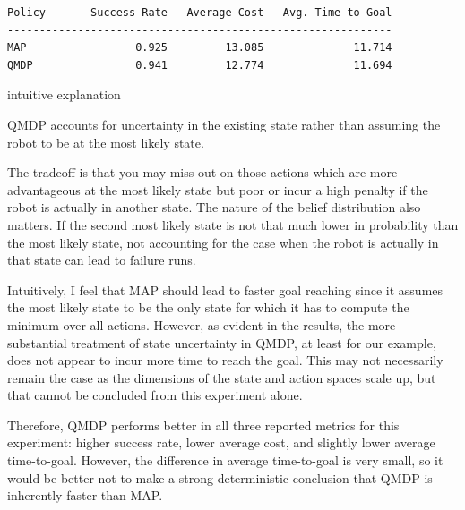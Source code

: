 \begin{Verbatim}[fontsize=\small]
Policy       Success Rate   Average Cost   Avg. Time to Goal
------------------------------------------------------------
MAP                 0.925         13.085              11.714
QMDP                0.941         12.774              11.694
\end{Verbatim}

intuitive explanation

QMDP accounts for uncertainty in the existing state rather than assuming the robot to be at the most likely state.

The tradeoff is that you may miss out on those actions which are more advantageous at the most likely state but poor or incur a high penalty if the robot is actually in another state. The nature of the belief distribution also matters. If the second most likely state is not that much lower in probability than the most likely state, not accounting for the case when the robot is actually in that state can lead to failure runs.

Intuitively, I feel that MAP should lead to faster goal reaching since it assumes the most likely state to be the only state for which it has to compute the minimum over all actions. However, as evident in the results, the more substantial treatment of state uncertainty in QMDP, at least for our example, does not appear to incur more time to reach the goal. This may not necessarily remain the case as the dimensions of the state and action spaces scale up, but that cannot be concluded from this experiment alone.


Therefore, QMDP performs better in all three reported metrics for this experiment: higher success rate, lower average cost, and slightly lower average time-to-goal. However, the difference in average time-to-goal is very small, so it would be better not to make a strong deterministic conclusion that QMDP is inherently faster than MAP.
